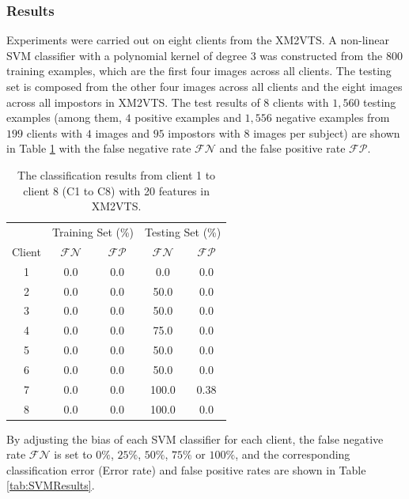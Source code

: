 \subsubsection{Results}
Experiments were carried out on eight clients from the XM2VTS. A non-linear SVM classifier with a polynomial kernel of degree $3$ was constructed from the $800$ training examples, which are the first four images across all clients. The testing set is composed from the other four images across all clients and the eight images across all impostors in XM2VTS. The test results of $8$ clients with $1,560$ testing examples (among them, $4$ positive examples and $1,556$ negative examples from $199$ clients with $4$ images and $95$ impostors with $8$ images per subject) are shown in \mbox{Table} \ref{tab:SVMRe} with the false negative rate $\mathcal{FN}$ and the false positive rate $\mathcal{FP}$.
\begin{table}[ht]
\caption{The classification results from client 1 to client 8 (C1 to C8) with 20 features in XM2VTS.}
 \begin{center}
   \begin{tabular}{|c|c|c|c|c|}
  \hline
    & \multicolumn{2}{c|}{Training Set (\%)} & \multicolumn{2}{c|}{Testing Set (\%)}\\
   \cline{2-5}
  Client & $\mathcal{FN}$ & $\mathcal{FP}$ & $\mathcal{FN}$ & $\mathcal{FP}$ \\
  \hline
  1 & 0.0 & 0.0 & 0.0 & 0.0\\
  2 & 0.0 & 0.0 & 50.0 & 0.0\\
  3 & 0.0 & 0.0 & 50.0 & 0.0\\
  4 & 0.0 & 0.0 & 75.0 & 0.0\\
  5 & 0.0 & 0.0 & 50.0 & 0.0\\
  6 & 0.0 & 0.0 & 50.0 & 0.0\\
  7 & 0.0 & 0.0 & 100.0 & 0.38\\
  8 & 0.0 & 0.0 & 100.0 & 0.0\\
  \hline
 \end{tabular}
 \end{center}
\label{tab:SVMRe}
\end{table} 
By adjusting the bias of each SVM classifier for each client, the false negative rate $\mathcal{FN}$ is set to $0\%$, $25\%$, $50\%$, $75\%$ or $100\%$, and the corresponding classification error (Error rate) and false positive rates are shown in \mbox{Table} \ref{tab:SVMResults}. 
